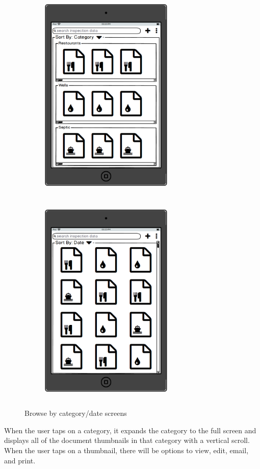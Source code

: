 \documentclass[twoside,letterpaper]{article}
\begin{document}
{\begin{figure}
    \centering
    \begin{subfigure}[h]{0.4\textwidth}
       \includegraphics[width=2.5in,height=4in]{Browse_By_Category.png}
    \end{subfigure}
    \qquad 
    \begin{subfigure}[h]{0.4\textwidth}
       \includegraphics[width=2.5in,height=4in]{Browse_By_Date.png}
    \end{subfigure}
     \caption{Browse by category/date screens}
\end{figure}
\newpage
\noindent When the user taps on a category, it expands the category to the full screen and displays all of the document thumbnails in that category with a vertical scroll. When the user taps on a thumbnail, there will be options to view, edit, email, and print.
}
\end{document}
